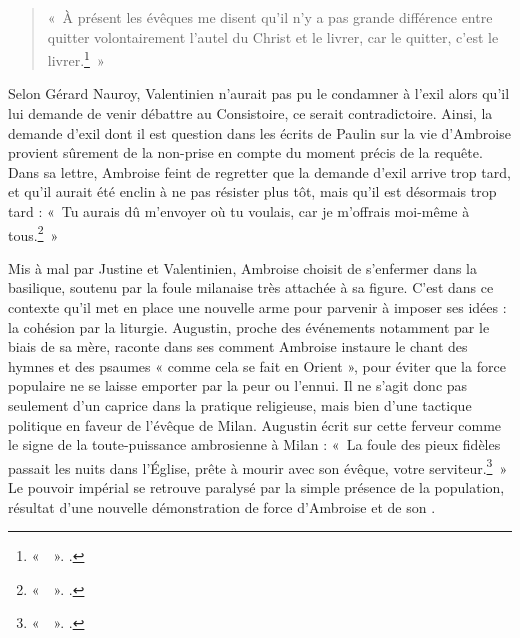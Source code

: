 \bigskip

\begin{quote}
    «~À présent les évêques me disent qu'il n'y a pas grande différence entre quitter volontairement l'autel du Christ et le livrer, car le quitter, c'est le livrer.\footnote{«~~». \cite[, 18]{ambroise_lettres}.}~»
\end{quote}

\bigskip

Selon Gérard Nauroy, Valentinien n'aurait pas pu le condamner à l'exil alors qu'il lui demande de venir débattre au Consistoire, ce serait contradictoire. Ainsi, la demande d'exil dont il est question dans les écrits de Paulin sur la vie d'Ambroise provient sûrement de la non-prise en compte du moment précis de la requête. Dans sa lettre, Ambroise feint de regretter que la demande d'exil arrive trop tard, et qu'il aurait été enclin à ne pas résister plus tôt, mais qu'il est désormais trop tard : «~Tu aurais dû m'envoyer où tu voulais, car je m'offrais moi-même à tous.\footnote{«~~». \cite[, 18]{ambroise_lettres}.}~»

\bigskip

Mis à mal par Justine et Valentinien, Ambroise choisit de s'enfermer dans la basilique, soutenu par la foule milanaise très attachée à sa figure. C'est dans ce contexte qu'il met en place une nouvelle arme pour parvenir à imposer ses idées : la cohésion par la liturgie. Augustin, proche des événements notamment par le biais de sa mère, raconte dans ses  comment Ambroise instaure le chant des hymnes et des psaumes « comme cela se fait en Orient », pour éviter que la force populaire ne se laisse emporter par la peur ou l'ennui. Il ne s'agit donc pas seulement d'un caprice dans la pratique religieuse, mais bien d'une tactique politique en faveur de l'évêque de Milan. Augustin écrit sur cette ferveur comme le signe de la toute-puissance ambrosienne à Milan : «~La foule des pieux fidèles passait les nuits dans l'Église, prête à mourir avec son évêque, votre serviteur.\footnote{«~~». \cite[\nopp IX, 7]{augustin_confessions}.}~» Le pouvoir impérial se retrouve paralysé par la simple présence de la population, résultat d'une nouvelle démonstration de force d'Ambroise et de son .

